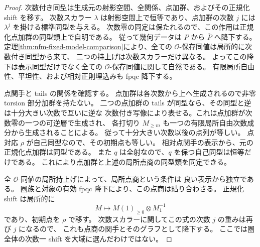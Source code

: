 \begin{proof}
次数付き同型は生成元の射影空間、全関係、点加群、およびその正規化 shift を移す。
次数スカラー $\lambda$ は射影空間上で恒等であり、点加群の次数 $j$ には
$\lambda^j$ を掛ける標準同型を与える。
次数零の同定は保たれるので、この作用は正規化点加群の同型類上で自明である。
従って幾何データは $P$ から $\overline P$ へ降下する。
定理\ref{thm:nfm-fixed-model-comparison}により、全ての
$\mathcal O$-保存同値は局所的に次数付き同型から来て、
二つの持上げは次数スカラーだけ異なる。
よってこの降下は表示同型だけでなく全ての $\mathcal O$-保存同値に関して自然である。
有限局所自由性、平坦性、および相対正則埋込みも fpqc 降下する。

点関手と tails の関係を確認する。
点加群は各次数から上へ生成されるので非零 torsion 部分加群を持たない。
二つの点加群の tails が同型なら、その同型と逆は十分大きい次数で互いに逆な
次数付き写像により表せる。これは点加群が次数零の一つの可逆層で生成され、
各打切り $M_{\geq m}$ も一つの有限局所自由次数成分から生成されることによる。
従って十分大きい次数以後の点列が等しい。
点対応 $\rho$ が自己同型なので、その初期点も等しい。
相対点関手の表示から、元の正規化点加群は同型である。
また $q$ は全射なので、$q$ を保つ自己同型は恒等だけである。
これにより点加群と上述の局所点商の同型類を同定できる。

全 $\mathcal O$-同値の局所持上げによって、局所点商という条件は
良い表示から独立である。
圏族と対象の有効 fpqc 降下により、この点商は貼り合わさる。
正規化 shift は局所的に
\[
 M\longmapsto M(1)_{\geq0}\otimes M_1^{-1}
\]
であり、初期点を $\rho$ で移す。
次数スカラーに関してこの式の次数 $j$ の重みは再び $j$ になるので、
これも点商の関手とそのグラフとして降下する。
ここでは圏全体の次数一 shift を大域に選んだわけではない。
\end{proof}


